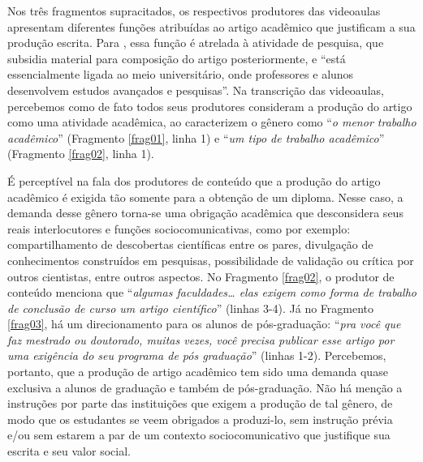  











Nos três fragmentos supracitados, os respectivos produtores das
videoaulas apresentam diferentes funções atribuídas ao artigo acadêmico
que justificam a sua produção escrita. Para \textcite[p.~66]{motta-roth2010}, essa função é atrelada à atividade de pesquisa, que subsidia
material para composição do artigo posteriormente, e ``está
essencialmente ligada ao meio universitário, onde professores e alunos
desenvolvem estudos avançados e pesquisas''. Na transcrição das
videoaulas, percebemos como de fato todos seus produtores consideram a
produção do artigo como uma atividade acadêmica, ao caracterizem o
gênero como ``\emph{o menor trabalho acadêmico}'' (Fragmento \ref{frag01}, linha
1) e ``\emph{um tipo de trabalho acadêmico}'' (Fragmento \ref{frag02}\hspace{0pt}, linha 1).

É perceptível na fala dos produtores de conteúdo que a produção do
artigo acadêmico é exigida tão somente para a obtenção de um diploma.
Nesse caso, a demanda desse gênero torna-se uma obrigação acadêmica que
desconsidera seus reais interlocutores e funções sociocomunicativas,
como por exemplo: compartilhamento de descobertas científicas entre os
pares, divulgação de conhecimentos construídos em pesquisas,
possibilidade de validação ou crítica por outros cientistas, entre
outros aspectos. No Fragmento \ref{frag02}, o produtor de conteúdo menciona que
``\emph{algumas faculdades\ldots{} elas exigem como forma de trabalho de
conclusão de curso um artigo científico}'' (linhas 3-4). Já no Fragmento \ref{frag03}, há um direcionamento para os alunos de pós-graduação: ``\emph{pra
você que faz mestrado ou doutorado, muitas vezes, você precisa publicar
esse artigo por uma exigência do seu programa de pós graduação}''
(linhas 1-2). Percebemos, portanto, que a produção de artigo acadêmico
tem sido uma demanda quase exclusiva a alunos de graduação e também de
pós-graduação. Não há menção a instruções por parte das instituições que
exigem a produção de tal gênero, de modo que os estudantes se veem
obrigados a produzi-lo, sem instrução prévia \cite{lillis1999} e/ou sem
estarem a par de um contexto sociocomunicativo que justifique sua
escrita e seu valor social.

